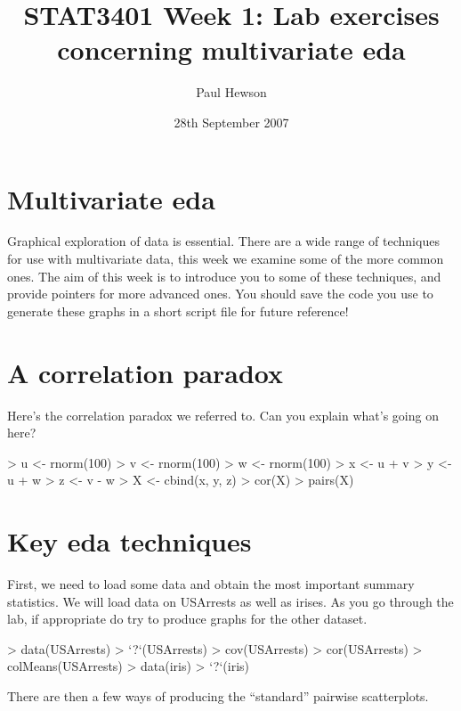 \documentclass[11pt]{article}
\title{STAT3401 Week 1: Lab exercises concerning multivariate eda}
\author{Paul Hewson}
\date{28th September 2007}
\begin{document}
\setlength{\parindent}{0pt}
\setlength{\parskip}{12pt}
\sffamily
\maketitle


\section{Multivariate eda}

Graphical exploration of data is essential.   There are a wide range of techniques for use with multivariate data, this week we examine some of the more common ones.   The aim of this week is to introduce you to some of these techniques, and provide pointers for more advanced ones.   You should save the code you use to generate these graphs in a short script file for future reference!


\section{A correlation paradox}

Here's the correlation paradox we referred to.   Can you explain what's going on here?

\begin{Schunk}
\begin{Sinput}
> u <- rnorm(100)
> v <- rnorm(100)
> w <- rnorm(100)
> x <- u + v
> y <- u + w
> z <- v - w
> X <- cbind(x, y, z)
> cor(X)
> pairs(X)
\end{Sinput}
\end{Schunk}


\section{Key eda techniques}

First, we need to load some data and obtain the most important summary statistics.   We will load data on USArrests as well as irises.   As you go through the lab, if appropriate do try to produce graphs for the other dataset.

\begin{Schunk}
\begin{Sinput}
> data(USArrests)
> `?`(USArrests)
> cov(USArrests)
> cor(USArrests)
> colMeans(USArrests)
> data(iris)
> `?`(iris)
\end{Sinput}
\end{Schunk}

There are then a few ways of producing the ``standard'' pairwise scatterplots.
\end{document}
